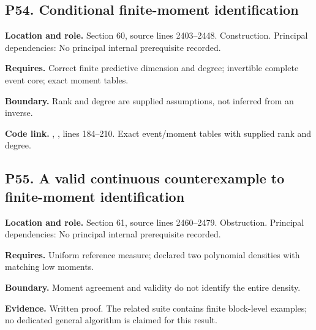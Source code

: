 \documentclass[11pt,letterpaper]{article}
\begin{document}
\par\noindent\begin{minipage}{\textwidth}
\subsection{P54. Conditional finite-moment
identification}\label{p54.-conditional-finite-moment-identification}

\textbf{Location and role.} Section 60, source lines 2403--2448.
Construction. Principal dependencies: No principal internal prerequisite
recorded.

\textbf{Requires.} Correct finite predictive dimension and degree;
invertible complete event core; exact moment tables.

\textbf{Boundary.} Rank and degree are supplied assumptions, not
inferred from an inverse.

\textbf{Code link.} ,
, lines 184--210. Exact event/moment
tables with supplied rank and degree.
\end{minipage}\par\medskip

\par\noindent\begin{minipage}{\textwidth}
\subsection{P55. A valid continuous counterexample to finite-moment
identification}\label{p55.-a-valid-continuous-counterexample-to-finite-moment-identification}

\textbf{Location and role.} Section 61, source lines 2460--2479.
Obstruction. Principal dependencies: No principal internal prerequisite
recorded.

\textbf{Requires.} Uniform reference measure; declared two polynomial
densities with matching low moments.

\textbf{Boundary.} Moment agreement and validity do not identify the
entire density.

\textbf{Evidence.} Written proof. The related suite contains finite
block-level examples; no dedicated general algorithm is claimed for this
result.
\end{minipage}\par\medskip
\end{document}
